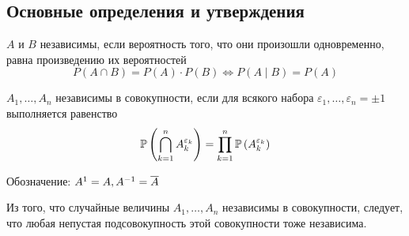 \subsection{Основные определения и утверждения}
\begin{definition} $A$ и $B$ независимы, если вероятность того,
    что они произошли одновременно, равна произведению их вероятностей
    $$P\left(A\cap B\right)
    =P\left(A\right)\cdot P\left(B\right)\Leftrightarrow P\left(A\mid B\right)
    =P\left(A\right)$$
\end{definition}
\begin{definition} $A_1, \dots, A_n$ независимы в совокупности,
    если для всякого набора $\varepsilon_1, \dots, \varepsilon_n=\pm 1$
    выполняется равенство
    $$\mathbb{P}\left( \bigcap_{k=1}^n A_{k}^{\varepsilon_k} \right)
    =\prod_{k=1}^n \mathbb{P}\left( A_{k}^{\varepsilon_k} \right)$$

    Обозначение: $A^1=A, A^{-1}=\overline{A}$
\end{definition}
\begin{affirmation}
    Из того, что случайные величины $A_1, \dots, A_n$ независимы в совокупности,
    следует, что любая непустая подсовокупность этой совокупности
    тоже независима.
\end{affirmation}
